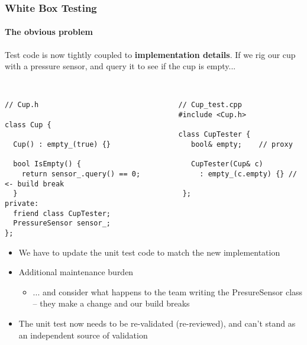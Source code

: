 \begin{frame}[fragile,t]
\frametitle{White Box Testing}
\framesubtitle {The obvious problem}
Test code is now tightly coupled to {\bf implementation details}.  If
we rig our cup with a pressure sensor, and query it to see if the cup
is empty...
{\scriptsize\
\begin{verbatim}
// Cup.h                                 // Cup_test.cpp
                                         #include <Cup.h>
class Cup {                              
                                         class CupTester {
  Cup() : empty_(true) {}                   bool& empty;    // proxy 
                                            
  bool IsEmpty() {                          CupTester(Cup& c) 
    return sensor_.query() == 0;              : empty_(c.empty) {} // <- build break
  }                                       };  
private:                                         
  friend class CupTester;                
  PressureSensor sensor_;                
};                                       
\end{verbatim}}
\begin{itemize}
\item We have to update the unit test code to match the new implementation
\item Additional maintenance burden
\begin{itemize}
\item ... and consider what happens to the team writing the
  PresureSensor class -- they make a change and our build breaks
\end{itemize}
\item The unit test now needs to be re-validated (re-reviewed), and
  can't stand as an independent source of validation
\end{itemize}

\end{frame}






